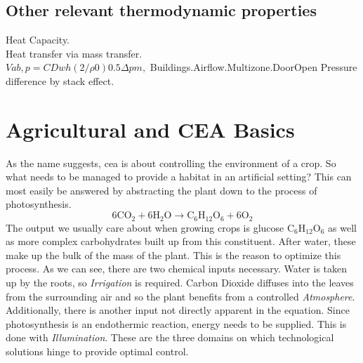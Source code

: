 


\subsection{Other relevant thermodynamic properties}
\label{sub:ther-props}
Heat Capacity.\\
Heat transfer via mass transfer.\\
$Vab,p = CD w h (2/ \rho 0)0.5 \Delta pm,$
Buildings.Airflow.Multizone.DoorOpen
Pressure difference by stack effect.



\section{Agricultural and CEA Basics}
\label{sec:fund-cea}
As the name suggests, \acl{cea} is about controlling the environment of a crop.
So what needs to be managed to provide a habitat in an artificial setting?
This can most easily be answered by abstracting the plant down to the process of photosynthesis.
$$
6 \text{CO}_2 + 6 \text{H}_2\text{O} \rightarrow \text{C}_6\text{H}_{12}\text{O}_6 + 6 \text{O}_2
$$
The output we usually care about when growing crops is glucose $\text{C}_6\text{H}_{12}\text{O}_6$ as well as more complex carbohydrates built up from this constituent.
After water, these make up the bulk of the mass of the plant.
This is the reason to optimize this process.
As we can see, there are two chemical inputs necessary.
Water is taken up by the roots, so \textit{Irrigation} is required.
Carbon Dioxide diffuses into the leaves from the surrounding air and so the plant benefits from a controlled \textit{Atmosphere}.
Additionally, there is another input not directly apparent in the equation.
Since photosynthesis is an endothermic reaction, energy needs to be supplied.
This is done with \textit{Illumination}.
These are the three domains on which technological solutions hinge to provide optimal control.

